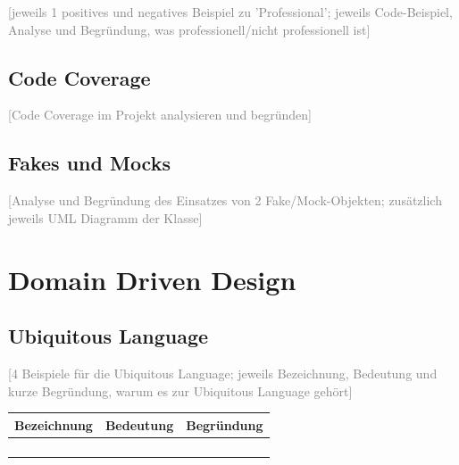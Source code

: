 \documentclass[a4paper,12pt]{article}
\newcommand{\placeholder}[1]{\textcolor{gray}{[#1]}}
\begin{document}
\placeholder{jeweils 1 positives und negatives Beispiel zu 'Professional'; jeweils Code-Beispiel,
    Analyse und Begründung, was professionell/nicht professionell ist}

\subsection*{Code Coverage}

\placeholder{Code Coverage im Projekt analysieren und begründen}

\subsection*{Fakes und Mocks}

\placeholder{Analyse und Begründung des Einsatzes von 2 Fake/Mock-Objekten;
    zusätzlich jeweils UML Diagramm der Klasse}

\newpage
\section{Domain Driven Design}

\subsection*{Ubiquitous Language}

\placeholder{4 Beispiele für die Ubiquitous Language; jeweils Bezeichnung, Bedeutung und kurze
    Begründung, warum es zur Ubiquitous Language gehört}

\bigskip
\begin{tabularx}{\textwidth}{|l|X|X|}
    \hline
    \textbf{Bezeichnung} & \textbf{Bedeutung} & \textbf{Begründung} \\
    \hline
                         &                    &                     \\[1.2em]
    \hline
                         &                    &                     \\[1.2em]
    \hline
                         &                    &                     \\[1.2em]
    \hline
                         &                    &                     \\[1.2em]
    \hline
\end{tabularx}
\end{document}
